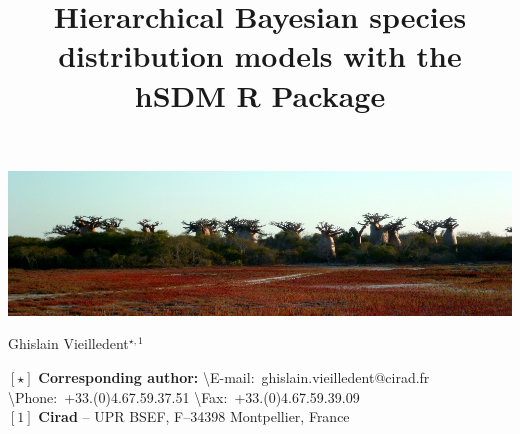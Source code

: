 \documentclass[a4paper, 12pt, leqno]{article}\usepackage[]{graphicx}\usepackage[]{color}
\title{Hierarchical Bayesian species distribution models with the \textbf{hSDM} R Package}
\date{}
\author{}
\begin{document}
\maketitle
\vspace{-1cm}
\begin{center}
  \includegraphics[width=\textwidth]{figures/header.jpg}
\end{center}
\vspace{1cm}
\begin{center}
  \large{Ghislain Vieilledent$^{\star,1}$}
\end{center}

\vspace{0.3cm}



{\footnotesize
  \begin{flushleft}
    $[\star]$ \textbf{Corresponding author:}
    \textbackslash{E-mail}:~ghislain.vieilledent@cirad.fr
    \textbackslash{Phone}:~+33.(0)4.67.59.37.51
    \textbackslash{Fax}:~+33.(0)4.67.59.39.09\\
    $[1]$ \textbf{Cirad} -- UPR BSEF, F–34398 Montpellier, France\\
\end{flushleft}}

\newpage

\renewcommand{\abstractname}{Abstract}
\newcommand{\keywords}[1]{\par\noindent
{\small{\em Keywords\/}: #1}}
\end{document}
